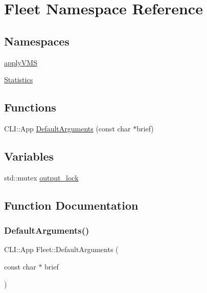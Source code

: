 \hypertarget{namespace_fleet}{}\section{Fleet Namespace Reference}
\label{namespace_fleet}
\subsection*{Namespaces}
\begin{DoxyCompactItemize}
\item 
 \hyperlink{namespace_fleet_1_1apply_v_m_s}{apply\+V\+MS}
\item 
 \hyperlink{namespace_fleet_1_1_statistics}{Statistics}
\end{DoxyCompactItemize}
\subsection*{Functions}
\begin{DoxyCompactItemize}
\item 
C\+L\+I\+::\+App \hyperlink{namespace_fleet_a92846af38313a15b39c9ddc67e3d4f67}{Default\+Arguments} (const char $\ast$brief)
\end{DoxyCompactItemize}
\subsection*{Variables}
\begin{DoxyCompactItemize}
\item 
std\+::mutex \hyperlink{namespace_fleet_a491597c9b994a0860400d0eacf5af996}{output\+\_\+lock}
\end{DoxyCompactItemize}


\subsection{Function Documentation}
\mbox{\label{namespace_fleet_a92846af38313a15b39c9ddc67e3d4f67}} 
\subsubsection{\texorpdfstring{Default\+Arguments()}{DefaultArguments()}}
{\footnotesize\ttfamily C\+L\+I\+::\+App Fleet\+::\+Default\+Arguments (\begin{DoxyParamCaption}\item[{const char $\ast$}]{brief }\end{DoxyParamCaption})}



